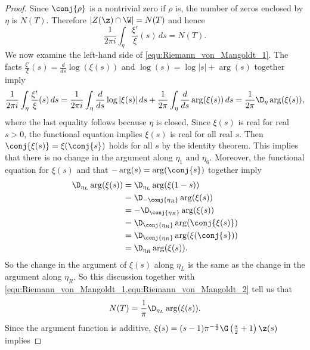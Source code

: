 \begin{proof}
        Since $\conj{\rho}$ is a nontrivial zero if $\rho$ is, the number of zeros enclosed by $\eta$ is $N(T)$. Therefore $|Z(\z) \cap \W| = N(T)$ and hence
        \begin{equation}\label{equ:Riemann_von_Mangoldt_1}
          \frac{1}{2\pi i}\int_{\eta}\frac{\xi'}{\xi}(s)\,ds = N(T).
        \end{equation}
        We now examine the left-hand side of \cref{equ:Riemann_von_Mangoldt_1}. The facts $\frac{\xi'}{\xi}(s) = \frac{d}{ds}\log(\xi(s))$ and $\log(s) = \log|s|+\arg(s)$ together imply
        \begin{equation}\label{equ:Riemann_von_Mangoldt_2}
          \frac{1}{2\pi i}\int_{\eta}\frac{\xi'}{\xi}(s)\,ds = \frac{1}{2\pi i}\int_{\eta}\frac{d}{ds}\log|\xi(s)|\,ds+\frac{1}{2\pi }\int_{\eta}\frac{d}{ds}\arg(\xi(s))\,ds = \frac{1}{2\pi}\D_{\eta}\arg(\xi(s)),
        \end{equation}
        where the last equality follows because $\eta$ is closed. Since $\xi(s)$ is real for real $s > 0$, the functional equation implies $\xi(s)$ is real for all real $s$. Then $\conj{\xi(s)} = \xi(\conj{s})$ holds for all $s$ by the identity theorem. This implies that there is no change in the argument along $\eta_{1}$ and $\eta_{6}$. Moreover, the functional equation for $\xi(s)$ and that $-\arg(s) = \arg(\conj{s})$ together imply
        \begin{align*}
          \D_{\eta_{L}}\arg(\xi(s)) &= \D_{\eta_{L}}\arg(\xi(1-s)) \\
          &= \D_{-\conj{\eta_{R}}}\arg(\xi(s)) \\
          &= -\D_{\conj{\eta_{R}}}\arg(\xi(s)) \\
          &= \D_{\conj{\eta_{R}}}\arg(\conj{\xi(s)}) \\
          &= \D_{\conj{\eta_{R}}}\arg(\xi(\conj{s})) \\
          &= \D_{{\eta_{R}}}\arg(\xi(s)).
        \end{align*}
        So the change in the argument of $\xi(s)$ along $\eta_{L}$ is the same as the change in the argument along $\eta_{R}$. So this discussion together with \cref{equ:Riemann_von_Mangoldt_1,equ:Riemann_von_Mangoldt_2} tell us that
        \begin{equation}\label{equ:Riemann_von_Mangoldt_3}
          N(T) = \frac{1}{\pi}\D_{\eta_{L}}\arg(\xi(s)).
        \end{equation}
        Since the argument function is additive, $\xi(s) = (s-1)\pi^{-\frac{s}{2}}\G\left(\frac{s}{2}+1\right)\z(s)$ implies 

\end{proof}
